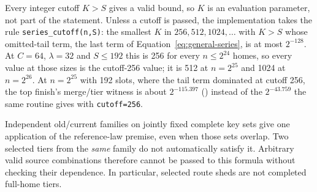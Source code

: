 \documentclass[11pt]{article}
\theoremstyle{definition}
\theoremstyle{remark}
\begin{document}
Every integer cutoff $K>S$ gives a valid bound, so $K$ is an evaluation
parameter, not part of the statement. Unless a cutoff is passed, the
implementation takes the rule \texttt{series\_cutoff(n,S)}: the smallest
$K$ in $256,512,1024,\ldots$ with $K>S$ whose omitted-tail term, the last
term of Equation~\eqref{eq:general-series}, is at most $2^{-128}$. At
$C=64$, $\lambda=32$ and $S\le192$ this is 256 for every $n\le2^{24}$ homes, so every
value at those sizes is the cutoff-256 value; it is 512 at
$n=2^{25}$ and 1024 at $n=2^{26}$. At $n=2^{25}$ with 192 slots, where the
tail term dominated at cutoff 256, the top finish's merge/tier witness is
about $2^{-115.397}$ () instead of the
$2^{-43.759}$ the same routine gives with \texttt{cutoff=256}.

Independent old/current families on jointly fixed complete key sets give
one application of the reference-law premise, even when those sets overlap.
Two selected tiers from the \emph{same} family do not automatically satisfy
it. Arbitrary valid source combinations therefore cannot be passed to this
formula without checking their dependence. In particular, selected route
sheds are not completed full-home tiers.
\end{document}
